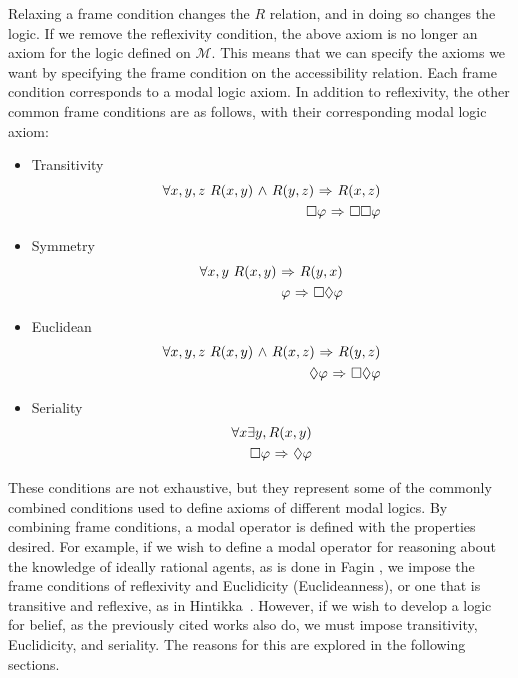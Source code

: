 Relaxing a frame condition changes the $R$ relation, and in doing so changes the logic. If we remove the reflexivity condition, the above axiom is no longer an axiom for the logic defined on $\mathcal{M}$. This means that we can specify the axioms we want by specifying the frame condition on the accessibility relation. Each frame condition corresponds to a modal logic axiom. In addition to reflexivity, the other common frame conditions are as follows, with their corresponding modal logic axiom:
\begin{itemize}
	\item Transitivity
	\begin{eqnarray}
	\forall x,y,z\ R(x,y) {\ \wedge \ } R(y,z) {\ \Rightarrow \ } R(x,z)\\
	\Box \varphi {\ \Rightarrow \ } \Box \Box \varphi
	\end{eqnarray}
	\item Symmetry
	\begin{eqnarray}
	\forall x,y\ R(x,y) {\ \Rightarrow \ } R(y,x)\\
	\varphi {\ \Rightarrow \ } \Box \Diamond \varphi
	\end{eqnarray}
	\item Euclidean
	\begin{eqnarray}
	\forall x,y,z\ R(x,y) {\ \wedge \ } R(x,z) {\ \Rightarrow \ } R(y,z)\\
	\Diamond \varphi {\ \Rightarrow \ } \Box \Diamond \varphi
	\end{eqnarray}
	\item Seriality
	\begin{eqnarray}
	\forall x \exists y, R(x,y) \\
	\Box \varphi {\ \Rightarrow \ } \Diamond \varphi
	\end{eqnarray}
\end{itemize}

These conditions are not exhaustive, but they represent some of the commonly combined conditions used to define axioms of different modal logics. By combining frame conditions, a modal operator is defined with the properties desired. For example, if we wish to define a modal operator for reasoning about the knowledge of ideally rational agents, as is done in Fagin \etal\cite{FHMV}, we impose the frame conditions of reflexivity and Euclidicity (Euclideanness), or one that is transitive and reflexive, as in Hintikka~\cite{Hintikka}. However, if we wish to develop a logic for belief, as the previously cited works also do, we must impose transitivity, Euclidicity, and seriality. The reasons for this are explored in the following sections.

